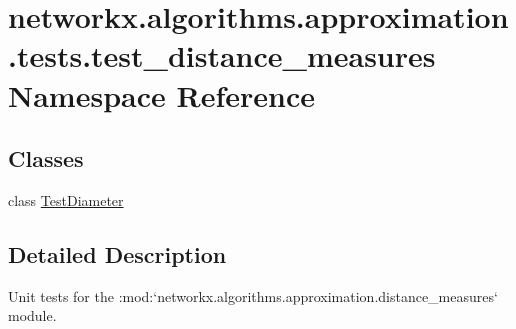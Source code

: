 \hypertarget{namespacenetworkx_1_1algorithms_1_1approximation_1_1tests_1_1test__distance__measures}{}\section{networkx.\+algorithms.\+approximation.\+tests.\+test\+\_\+distance\+\_\+measures Namespace Reference}
\label{namespacenetworkx_1_1algorithms_1_1approximation_1_1tests_1_1test__distance__measures}
\subsection*{Classes}
\begin{DoxyCompactItemize}
\item 
class \hyperlink{classnetworkx_1_1algorithms_1_1approximation_1_1tests_1_1test__distance__measures_1_1TestDiameter}{Test\+Diameter}
\end{DoxyCompactItemize}


\subsection{Detailed Description}
\begin{DoxyVerb}Unit tests for the :mod:`networkx.algorithms.approximation.distance_measures` module.
\end{DoxyVerb}
 